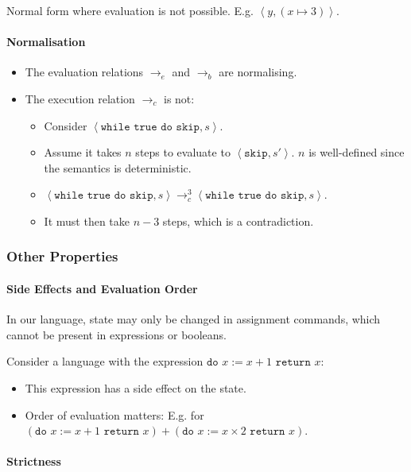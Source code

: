 \documentclass[twocolumn,english]{article}
\begin{document}
Normal form where evaluation is not possible. E.g. $\left\langle y,(x\mapsto3)\right\rangle $.

\paragraph{Normalisation}
\begin{itemize}
\item The evaluation relations $\rightarrow_{e}$ and $\rightarrow_{b}$
are normalising.
\item The execution relation $\rightarrow_{c}$ is not:
\begin{itemize}
\item Consider $\left\langle \texttt{while true do skip},s\right\rangle $.
\item Assume it takes $n$ steps to evaluate to $\left\langle \texttt{skip},s'\right\rangle $.
$n$ is well-defined since the semantics is deterministic.
\item $\left\langle \texttt{while true do skip},s\right\rangle \rightarrow_{c}^{3}\left\langle \texttt{while true do skip},s\right\rangle $.
\item It must then take $n-3$ steps, which is a contradiction.
\end{itemize}
\end{itemize}

\subsubsection{Other Properties}

\paragraph{Side Effects and Evaluation Order}

In our language, state may only be changed in assignment commands,
which cannot be present in expressions or booleans.

Consider a language with the expression \texttt{$\texttt{do }x:=x+1\texttt{ return }x$}:
\begin{itemize}
\item This expression has a side effect on the state.
\item Order of evaluation matters: E.g. for $(\texttt{do }x:=x+1\texttt{ return }x)+(\texttt{do }x:=x\times2\texttt{ return }x)$.
\end{itemize}

\paragraph{Strictness}
\end{document}
